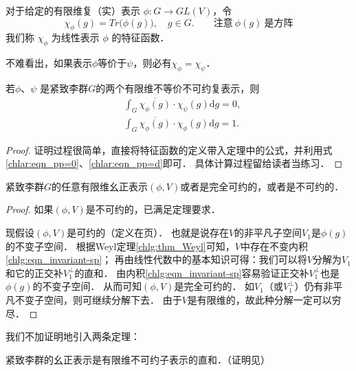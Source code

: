 \begin{definition}
	对于给定的有限维复（实）表示 $\phi: G \rightarrow {GL}(V)$，令
	\begin{equation}
		\chi_{\phi}(g)= Tr \bigl(\phi(g)\bigr), \quad g \in G.
		\qquad \text{注意}\  \phi(g) \  \text{是方阵}
	\end{equation}
	我们称 $\chi_{\phi}$ 为线性表示 $\phi$ 的{\heiti 特征函数}．
\end{definition}

不难看出，如果表示$\phi$等价于$\psi$，则必有$\chi_{\phi}=\chi_\psi$．


\begin{theorem}\label{chlar:thm_Xo}
	若$\phi$、$\psi$ 是紧致李群$G$的两个有限维不等价不可约复表示，则
	\begin{align}
		& \int_G \overline{\chi_{\phi}(g)} \cdot \chi_\psi(g) \mathrm{d} g=0, \\
		& \int_G \overline{\chi_{\phi}(g)} \cdot \chi_{\phi}(g) \mathrm{d} g=1 .
	\end{align}
\end{theorem}

\begin{proof}
	证明过程很简单，直接将特征函数的定义带入定理中的公式，并利用式\eqref{chlar:eqn_pp=0}、\eqref{chlar:eqn_pp=d}即可．
	具体计算过程留给读者当练习．
\end{proof}


\begin{theorem}
	紧致李群$G$的任意有限维幺正表示$(\phi,V)$或者是完全可约的，或者是不可约的．
\end{theorem}

\begin{proof}
	如果$(\phi,V)$是不可约的，已满足定理要求．
	
	现假设$(\phi,V)$是可约的（定义在\pageref{chtop:def_irreducible-representation}页）．
	也就是说存在$V$的非平凡子空间$V_1$是$\phi(g)$的不变子空间．
	根据Weyl定理\ref{chlg:thm_Weyl}可知，$V$中存在不变内积\eqref{chlg:eqn_invariant-sp}；
	再由线性代数中的基本知识可得：我们可以将$V$分解为$V_1$和它的正交补$V_1^{\perp}$的直和．
	由内积\eqref{chlg:eqn_invariant-sp}容易验证正交补$V_1^{\perp}$也是$\phi(g)$的不变子空间．
	从而可知$(\phi,V)$是完全可约的．
	如$V_1$（或$V_1^{\perp}$）仍有非平凡不变子空间，则可继续分解下去．
	由于$V$是有限维的，故此种分解一定可以穷尽．
\end{proof}

我们不加证明地引入两条定理：

\begin{theorem}\label{chlar:thm_CG-FU}
	紧致李群的幺正表示是有限维不可约子表示的直和．（证明见\parencite[p.346]{qiuws-2011}）
\end{theorem}

